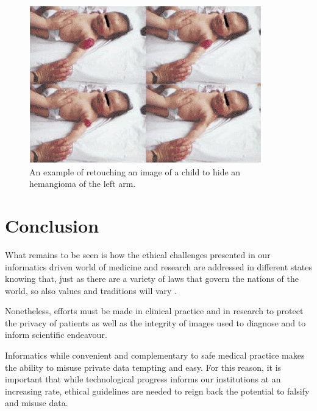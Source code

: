 \documentclass[british,a4paper, 12pt]{article}
\begin{document}
\begin{figure}
\caption{An example of retouching an image of a child to hide an hemangioma of the left arm.}
\label{fig:cutroneimage}
\includegraphics[natheight=\textheight,natwidth=\textwidth]{images/cutrone2001fig.png}

\end{figure}

\section{Conclusion}

What remains to be seen is how the ethical challenges presented in our informatics driven
world of medicine and research are addressed in different states knowing that, just as there
are a variety of laws that govern the nations of the world, so also values and traditions will
vary \parencite{kluge2000professional}.

Nonetheless, efforts must be made in clinical practice and in research to protect the
privacy  of patients as well as the integrity of images used to diagnose and to inform
scientific endeavour.

Informatics while convenient and complementary to  safe medical practice makes the ability
to misuse private data tempting and easy. For this reason, it is important that while
technological progress informs our institutions at an increasing rate, ethical guidelines
are needed to reign back the potential to falsify and misuse data.


\printbibliography
\end{document}
